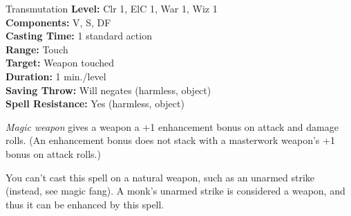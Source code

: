 {Transmutation}
{
	\textbf{Level:}
	Clr 1, ElC 1, War 1, Wiz 1\\
	\textbf{Components:}
	V, S, DF\\
	\textbf{Casting Time:}
	1 standard action\\
	\textbf{Range:}
	Touch\\
	\textbf{Target:}
	Weapon touched\\
	\textbf{Duration:}
	1 min./level\\
	\textbf{Saving Throw:}
	Will negates (harmless, object)\\
	\textbf{Spell Resistance:}
	Yes (harmless, object)\\
}
{
	\emph{Magic weapon} gives a weapon a +1 enhancement bonus on attack and damage rolls. (An enhancement bonus does not stack with a masterwork weapon's +1 bonus on attack rolls.)

	You can't cast this spell on a natural weapon, such as an unarmed strike (instead, see magic fang). A monk's unarmed strike is considered a weapon, and thus it can be enhanced by this spell.

}

